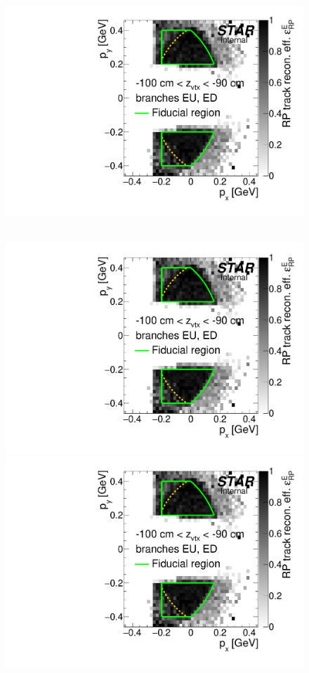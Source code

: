 \begin{figure}[hb]
{  \includegraphics[width=\linewidth,page=7]{graphics/corrections/mcEffPxPy.pdf}
}~
\parbox{0.495\textwidth}{
  \centering
  \includegraphics[width=\linewidth,page=4]{graphics/corrections/mcEffPxPy.pdf}\\
  \includegraphics[width=\linewidth,page=6]{graphics/corrections/mcEffPxPy.pdf}\\
}
\end{figure}
